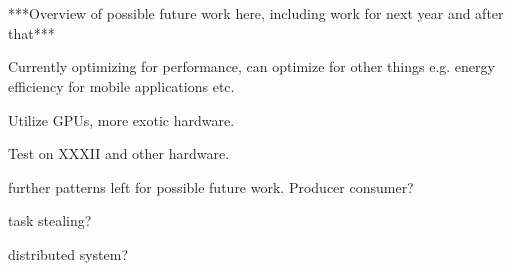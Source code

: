 \section{}

***Overview of possible future work here, including work for next year and after that***

Currently optimizing for performance, can  optimize for other things e.g. energy efficiency for mobile applications etc.

Utilize GPUs, more exotic hardware.

Test on XXXII and other hardware.

further patterns left for possible future work. Producer consumer?

task stealing?

distributed system?